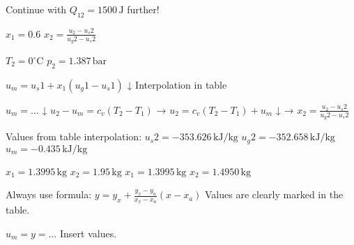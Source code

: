 Continue with \( Q_{12} = 1500 \, \text{J} \) further!  

\( x_1 = 0.6 \)  
\( x_2 = \frac{u_2 - u_s2}{u_g2 - u_s2} \)  

\( T_2 = 0^\circ \text{C} \)  
\( p_2 = 1.387 \, \text{bar} \)  

\( u_m = u_s1 + x_1 (u_g1 - u_s1) \)  
↓  
Interpolation in table  

\( u_m = \dots \)  
↓  
\( u_2 - u_m = c_v (T_2 - T_1) \)  
→ \( u_2 = c_v (T_2 - T_1) + u_m \)  
↓  
→ \( x_2 = \frac{u_2 - u_s2}{u_g2 - u_s2} \)  

Values from table interpolation:  
\( u_s2 = -353.626 \, \text{kJ/kg} \)  
\( u_g2 = -352.658 \, \text{kJ/kg} \)  
\( u_m = -0.435 \, \text{kJ/kg} \)  

\( x_1 = 1.3995 \, \text{kg} \)  
\( x_2 = 1.95 \, \text{kg} \)  
\( x_1 = 1.3995 \, \text{kg} \)  
\( x_2 = 1.4950 \, \text{kg} \)  

Always use formula: \( y = y_x + \frac{y_x - y_a}{x_x - x_a} (x - x_a) \)  
Values are clearly marked in the table.  

\( u_m = y = \dots \)  
Insert values.
